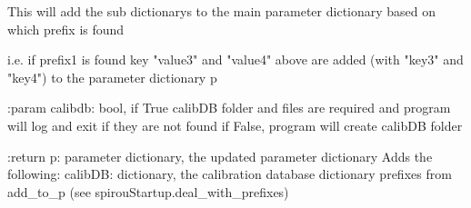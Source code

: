 \begin{minipage}{\textwidth}
\begin{pythondocstring}
        This will add the sub dictionarys to the main parameter dictionary
        based on which prefix is found

        i.e. if prefix1 is found key "value3" and "value4" above are added
        (with "key3" and "key4") to the parameter dictionary p

:param calibdb: bool, if True calibDB folder and files are required and
                program will log and exit if they are not found
                if False, program will create calibDB folder

:return p: parameter dictionary, the updated parameter dictionary
        Adds the following:
            calibDB: dictionary, the calibration database dictionary
            prefixes from add_to_p (see spirouStartup.deal_with_prefixes)
\end{pythondocstring}
\end{minipage}


